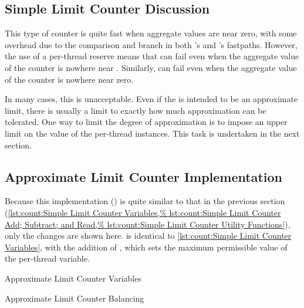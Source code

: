\subsection{Simple Limit Counter Discussion}
\label{sec:count:Simple Limit Counter Discussion}

This type of counter is quite fast when aggregate values are near zero,
with some overhead due to the comparison and branch in both
's and 's fastpaths.
However, the use of a per-thread  reserve means that
 can fail even when
the aggregate value of the counter is nowhere near .
Similarly,  can fail
even when the aggregate value of the counter is nowhere near zero.

In many cases, this is unacceptable.
Even if the  is intended to be an approximate limit,
there is usually a limit to exactly how much approximation can be tolerated.
One way to limit the degree of approximation is to impose an upper limit
on the value of the per-thread  instances.
This task is undertaken in the next section.

\subsection{Approximate Limit Counter Implementation}
\label{sec:count:Approximate Limit Counter Implementation}

Because this implementation () is quite similar to
that in the previous section
(\cref{lst:count:Simple Limit Counter Variables,%
lst:count:Simple Limit Counter Add; Subtract; and Read,%
lst:count:Simple Limit Counter Utility Functions}),
only the changes are shown here.
is identical to
\cref{lst:count:Simple Limit Counter Variables},
with the addition of , which sets the maximum
permissible value of the per-thread  variable.

\begin{listing}

\caption{Approximate Limit Counter Variables}
\label{lst:count:Approximate Limit Counter Variables}
\end{listing}

\begin{listing}

\caption{Approximate Limit Counter Balancing}
\label{lst:count:Approximate Limit Counter Balancing}
\end{listing}

